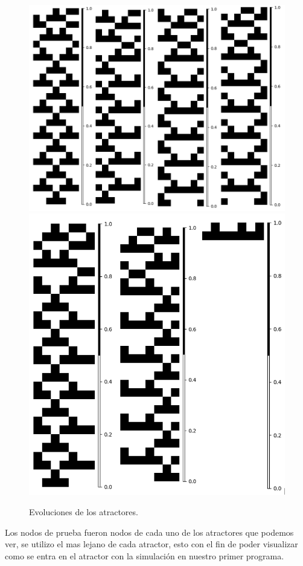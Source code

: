 \documentclass[11pt]{article}
\begin{document}
			\begin{figure}[H]
			\centering
			\includegraphics[scale=0.3]{resources/Atractores54/atractor_54_size_7_res.png}
			\includegraphics[scale=0.3]{resources/Atractores54/atractor_54_size_7_res1.png}
			\caption{Evoluciones de los atractores.}\label{fig:picture}
			\end{figure}
			Los nodos de prueba fueron nodos de cada uno de los atractores que podemos ver, se utilizo el mas lejano de cada atractor, esto con el fin de poder visualizar como se entra en el atractor con la simulación en nuestro primer programa.
\end{document}
